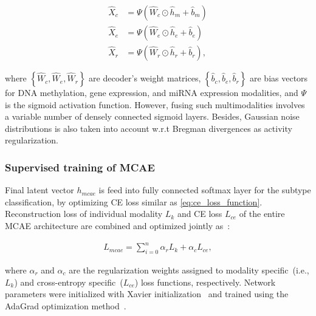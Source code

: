 \begin{equation}
    \begin{aligned}
        \hat{X}_{c} &=\Psi\left(\hat W_{c} \odot \hat{h}_{m}+\hat{b}_{m}\right) \\
        \hat{X}_{e} &=\Psi\left(\hat W_{e} \odot \hat{h}_{e}+\hat{b}_{e}\right) \\
        \hat{X}_{r} &=\Psi\left(\hat W_{r} \odot \hat{h}_{r}+\hat{b}_{r}\right),
        \end{aligned}
\end{equation}

\hspace*{3.5mm} where $\left\{\hat W_{c}, \hat W_{e}, \hat W_{r}\right\}$ are decoder's weight matrices, $\left\{\hat b_{c}, \hat b_{e}, \hat b_{r}\right\}$ are bias vectors for DNA methylation, gene expression, and miRNA expression modalities, and $\Psi$ is the sigmoid activation function. However, fusing such multimodalities involves a variable number of densely connected sigmoid layers. Besides, Gaussian noise distributions is also taken into account w.r.t Bregman divergences as activity regularization. 

\subsubsection{Supervised training of MCAE}
Final latent vector $h_{mcae}$ is feed into fully connected softmax layer for the subtype classification, by optimizing CE loss similar as \cref{eq:ce_loss_function}. 
Reconstruction loss of individual modality ${L}_{k}$ and CE loss ${L}_{ce}$ of the entire MCAE architecture are combined and optimized jointly as~\cite{mmdcae}: 

\begin{align}
    L_{mcae}=\sum_{i=0}^{n} \alpha_{r} {L}_{k}+\alpha_{c} {L}_{ce},
\end{align}

\hspace*{3.5mm} where $\alpha_{r}$ and $\alpha_{c}$ are the regularization weights assigned to modality specific~(i.e., ${L}_{k}$) and cross-entropy specific~(${L}_{ce}$) loss functions, respectively. Network parameters were initialized with Xavier initialization~\cite{xavier} and trained using the AdaGrad optimization method~\cite{duchi2011adaptive}. 

